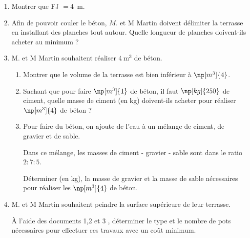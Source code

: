 \documentclass[11pt]{article}
\begin{document}
\begin{enumerate}
	\item Montrer que FJ $= 4$~m.

	\item Afin de pouvoir couler le béton, $M$. et M Martin doivent délimiter la terrasse en installant des planches tout autour. Quelle longueur de planches doivent-ils acheter au minimum ?

	\item M. et M Martin souhaitent réaliser $4 \mathrm{~m}^{3}$ de béton.

	\begin{enumerate}
		\item Montrer que le volume de la terrasse est bien inférieur à $\np[m^3]{4}$.

		\item Sachant que pour faire $\np[m^3]{1}$ de béton, il faut $\np[kg]{250}$ de ciment, quelle masse de ciment (en kg) doivent-ils acheter pour réaliser $\np[m^3]{4}$ de béton ?

		\item Pour faire du béton, on ajoute de l'eau à un mélange de ciment, de gravier et de sable.

Dans ce mélange, les masses de ciment - gravier - sable sont dans le ratio $2: 7: 5$.

Déterminer (en kg), la masse de gravier et la masse de sable nécessaires pour réaliser les $\np[m^3]{4}$ de béton.
		\end{enumerate}

	\item M. et M Martin souhaitent peindre la surface supérieure de leur terrasse.

À l'aide des documents 1,2 et 3 , déterminer le type et le nombre de pots nécessaires pour effectuer ces travaux avec un coût minimum.

\begin{center}



\end{center}
\end{enumerate}
\end{document}
